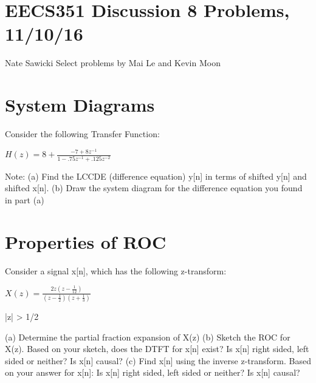 \documentclass[11pt]{article}
\begin{document}
\section*{EECS351 Discussion 8 Problems, 11/10/16}
Nate Sawicki \newline
Select problems by Mai Le and Kevin Moon


\section{System Diagrams}

Consider the following Transfer Function:

\vspace{3mm}
\begin{center}

$
H(z) = 8 + \frac{-7+8z^{-1}}{1 - .75z^{-1} + .125z^{-2}}
$
\end{center}

\vspace{3mm}

Note:\newline
(a) Find the LCCDE (difference equation) y[n] in terms of shifted y[n] and shifted x[n]. \newline
(b) Draw the system diagram for the difference equation you found in part (a)

\vspace{3mm}

\section{Properties of ROC}
Consider a signal x[n], which has the following z-transform:
\vspace{2mm}

\begin{center}

$
X(z) = \frac{2z(z-\frac{1}{12})}{(z-\frac{1}{2})(z+\frac{1}{3})}
$
\end{center}
|z| > 1/2

\vspace{3mm}

(a) Determine the partial fraction expansion of X(z)\newline
(b) Sketch the ROC for X(z). Based on your sketch, does the DTFT for x[n] exist? Is x[n] right sided, left sided or neither? Is x[n] causal?\newline
(c) Find x[n] using the inverse z-transform. Based on your answer for x[n]: Is x[n] right sided, left sided or neither? Is x[n] causal?\newline
\end{document}
